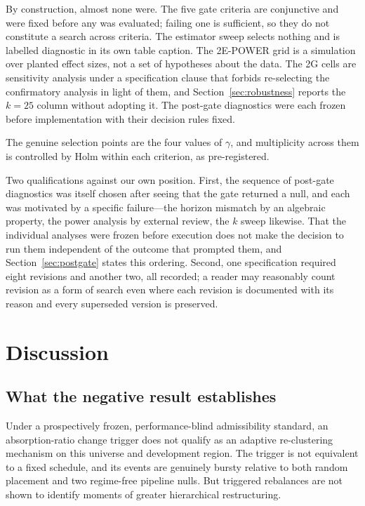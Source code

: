 \documentclass[12pt,letterpaper]{article}
\begin{document}
By construction, almost none were. The five gate criteria are conjunctive and were fixed
before any was evaluated; failing one is sufficient, so they do not constitute a search
across criteria. The estimator sweep selects nothing and is labelled diagnostic in its own
table caption. The 2E-POWER grid is a simulation over planted effect sizes, not a set of
hypotheses about the data. The 2G cells are sensitivity analysis under a specification
clause that forbids re-selecting the confirmatory analysis in light of them, and
Section~\ref{sec:robustness} reports the $k = 25$ column without adopting it. The
post-gate diagnostics were each frozen before implementation with their decision rules
fixed.

The genuine selection points are the four values of $\gamma$, and multiplicity across
them is controlled by Holm within each criterion, as pre-registered.

Two qualifications against our own position. First, the sequence of post-gate diagnostics
was itself chosen after seeing that the gate returned a null, and each was motivated by a
specific failure---the horizon mismatch by an algebraic property, the power analysis by
external review, the $k$ sweep likewise. That the individual analyses were frozen before
execution does not make the decision to run them independent of the outcome that prompted
them, and Section~\ref{sec:postgate} states this ordering. Second, one specification
required eight revisions and another two, all recorded; a reader may reasonably count
revision as a form of search even where each revision is documented with its reason and
every superseded version is preserved.

\section{Discussion}

\subsection{What the negative result establishes}
\label{sec:whatestablished}

Under a prospectively frozen, performance-blind admissibility standard, an
absorption-ratio change trigger does not qualify as an adaptive re-clustering
mechanism on this universe and development region. The trigger is not equivalent to
a fixed schedule, and its events are genuinely bursty relative to both random
placement and two regime-free pipeline nulls. But triggered rebalances are not shown
to identify moments of greater hierarchical restructuring.
\end{document}
